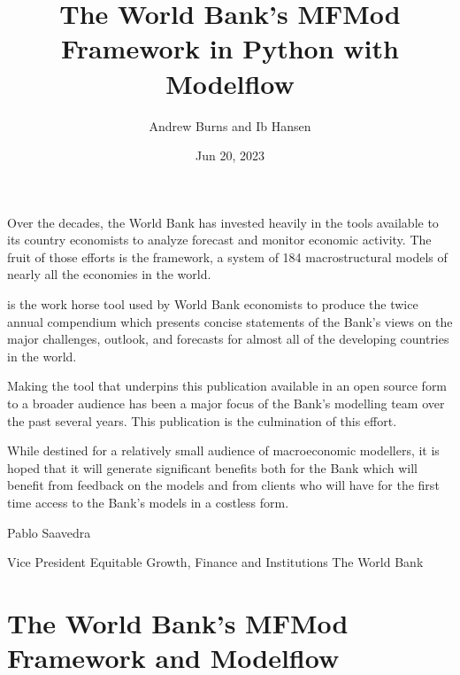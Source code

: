 \documentclass[letterpaper,10pt,english]{jupyterBook}
\title{The World Bank's MFMod Framework in Python with Modelflow}
\date{Jun 20, 2023}
\author{Andrew Burns and Ib Hansen}
\begin{document}
\pagestyle{empty}
\sphinxmaketitle
\pagestyle{plain}
\sphinxtableofcontents
\pagestyle{normal}
\label{\detokenize{content/introduction::doc}}


\sphinxAtStartPar
Over the decades, the World Bank has invested heavily in the tools available to its country economists to analyze forecast and monitor economic activity.  The fruit of those efforts is the  framework, a system of 184 macro\sphinxhyphen{}structural models of nearly all the economies in the world.

\sphinxAtStartPar
{} is the work horse tool used by World Bank economists to produce the twice annual compendium  which presents concise statements of the Bank’s views on the major challenges, outlook, and forecasts for almost all of the developing countries in the world.

\sphinxAtStartPar
Making the tool that underpins this publication available in an open source form to a broader audience has been a major focus of the Bank’s modelling team over the past several years.  This publication is the culmination of this effort.

\sphinxAtStartPar
While destined for a relatively small audience of macroeconomic modellers, it is hoped that it will generate significant benefits both for the Bank which will benefit from feedback on the models and from clients who will have for the first time access to the Bank’s models in a costless form.

\sphinxAtStartPar
Pablo Saavedra

\sphinxAtStartPar
Vice President
Equitable Growth, Finance and Institutions
The World Bank

\sphinxstepscope


\part{The World Bank's MFMod Framework and Modelflow}

\sphinxstepscope
\end{document}
